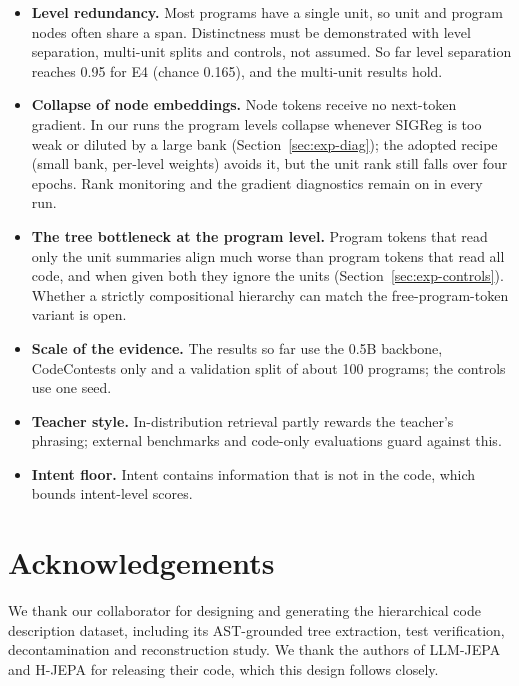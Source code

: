 \documentclass[11pt]{article}
\begin{document}
\begin{itemize}
  \item \textbf{Level redundancy.} Most programs have a single unit, so unit and program nodes often share a span.
        Distinctness must be demonstrated with level separation, multi-unit splits and controls, not assumed. So far
        level separation reaches 0.95 for E4 (chance 0.165), and the multi-unit results hold.
  \item \textbf{Collapse of node embeddings.} Node tokens receive no next-token gradient. In our runs the program
        levels collapse whenever SIGReg is too weak or diluted by a large bank (Section~\ref{sec:exp-diag}); the
        adopted recipe (small bank, per-level weights) avoids it, but the unit rank still falls over four epochs.
        Rank monitoring and the gradient diagnostics remain on in every run.
  \item \textbf{The tree bottleneck at the program level.} Program tokens that read only the unit summaries align
        much worse than program tokens that read all code, and when given both they ignore the units
        (Section~\ref{sec:exp-controls}). Whether a strictly compositional hierarchy can match the free-program-token
        variant is open.
  \item \textbf{Scale of the evidence.} The results so far use the 0.5B backbone, CodeContests only and a
        validation split of about 100 programs; the controls use one seed.
  \item \textbf{Teacher style.} In-distribution retrieval partly rewards the teacher's phrasing; external benchmarks and
        code-only evaluations guard against this.
  \item \textbf{Intent floor.} Intent contains information that is not in the code, which bounds intent-level scores.
\end{itemize}

\section*{Acknowledgements}
We thank our collaborator for designing and generating the hierarchical code description dataset, including its
AST-grounded tree extraction, test verification, decontamination and reconstruction study. We thank the authors of
LLM-JEPA and H-JEPA for releasing their code, which this design follows closely.



\end{document}
